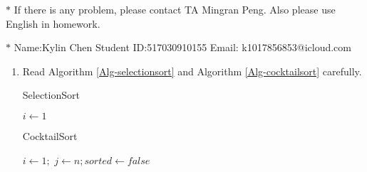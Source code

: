 \documentclass[12pt,a4paper]{article}
\theoremstyle{definition}
\begin{document}
\noindent

\noindent{}
\begin{center}
\footnotesize{\color{red}$*$ If there is any problem, please contact TA Mingran Peng. Also please use English in homework.}

\footnotesize{\color{blue}$*$ Name:Kylin Chen  \quad Student ID:517030910155 \quad Email: k1017856853@icloud.com}
\end{center}

\begin{enumerate}


\item Read Algorithm \ref{Alg-selectionsort} and Algorithm \ref{Alg-cocktailsort} carefully. \par

\begin{minipage}[t]{0.45\textwidth}
\begin{algorithm}[H]
\BlankLine
\caption{SelectionSort}
\label{Alg-selectionsort}
\BlankLine
	$i\leftarrow 1$\;

\end{algorithm}
\end{minipage}
\hfill
\begin{minipage}[t]{0.45\textwidth}
\begin{algorithm}[H]
\BlankLine
\caption{CocktailSort}
\label{Alg-cocktailsort}
\BlankLine
	$i\leftarrow 1;$ $j\leftarrow n;$$sorted\leftarrow false$\;
\end{algorithm}
\end{minipage}


\end{enumerate}
\end{document}
